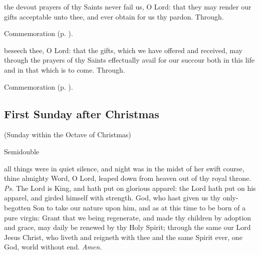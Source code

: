 
\secret
{} the devout prayers of thy Saints never fail us, O Lord: that they may render our gifts acceptable unto thee, and ever obtain for us thy pardon. Through.

\begin{rubric}
    Commemoration  (p. \pageref{NativityMassIIISecret}).
\end{rubric}


\postcommunion
{} beseech thee, O Lord: that the gifts, which we have offered and received, may through the prayers of thy Saints effectually avail for our succour both in this life and in that which is to come. Through.

\begin{rubric}
    Commemoration  (p. \pageref{NativityMassIIIPostcommunion}).
\end{rubric}


\subsection{First Sunday after Christmas}

\centerline{\small{(Sunday within the Octave of Christmas)}}

\fancyhead[RE,LO]{}
\begin{inhead}
{Semidouble}
\end{inhead}


\introit
{} all things were in quiet silence, and night was in the midst of her swift course, thine almighty Word, O Lord, leaped down from heaven out of thy royal throne. \textit{Ps.} The Lord is King, and hath put on glorious apparel: the Lord hath put on his apparel, and girded himself with strength.
\collect
{} God, who hast given us thy only-begotten Son to take our nature upon him, and as at this time to be born of a pure virgin: Grant that we being regenerate, and made thy children by adoption and grace, may daily be renewed by thy Holy Spirit; through the same our Lord Jesus Christ, who liveth and reigneth with thee and the same Spirit ever, one God, world without end. \textit{Amen.}


